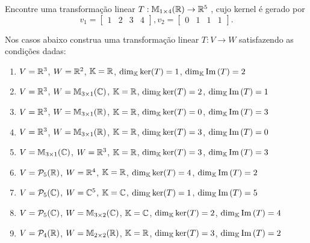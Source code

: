 \documentclass[12pt]{exam}
\begin{document}
\begin{exercicio}
  Encontre uma transforma\c{c}\~ao linear $T : \mathbb{M}_{1 \times 4}(\mathbb{R}) \to \mathbb{R}^5$ , cujo kernel \'e gerado por
  \[
      v_1 = \begin{bmatrix}
                1 & 2 & 3 & 4
            \end{bmatrix},
      v_2 = \begin{bmatrix}
                0 & 1 & 1 & 1
            \end{bmatrix}.
  \]
\end{exercicio}

\begin{exercicio}
  Nos casos abaixo construa uma transforma\c{c}\~ao linear $T : V \to W$ satisfazendo as condi\c{c}\~oes dadas:
  \begin{enumerate}[label={\alph*})]
    \item $V = \mathbb{R}^3$, $W = \mathbb{R}^2$, $\mathbb{K} = \mathbb{R}$, $\dim_{\mathbb{K}} \ker(T) = 1$, $\dim_{\mathbb{K}} {\rm Im\,}(T) = 2$

    \item $V = \mathbb{R}^3$, $W = \mathbb{M}_{3\times 1}(\mathbb{C})$, $\mathbb{K} = \mathbb{R}$, $\dim_{\mathbb{K}} \ker(T) = 2$, $\dim_{\mathbb{K}} {\rm Im\,}(T) = 1$

    \item $V = \mathbb{R}^3$, $W = \mathbb{M}_{3\times 1}(\mathbb{R})$, $\mathbb{K} = \mathbb{R}$, $\dim_{\mathbb{K}} \ker(T) = 0$, $\dim_{\mathbb{K}} {\rm Im\,}(T) = 3$

    \item $V = \mathbb{R}^3$, $W = \mathbb{M}_{3\times 1}(\mathbb{R})$, $\mathbb{K} = \mathbb{R}$, $\dim_{\mathbb{K}} \ker(T) = 3$, $\dim_{\mathbb{K}} {\rm Im\,}(T) = 0$

    \item $V = \mathbb{M}_{3\times 1}(\mathbb{C})$, $W = \mathbb{R}^3$, $\mathbb{K} = \mathbb{R}$, $\dim_{\mathbb{K}} \ker(T) = 3$, $\dim_{\mathbb{K}} {\rm Im\,}(T) = 3$

    \item $V = \mathcal{P}_5(\mathbb{R})$, $W = \mathbb{R}^4$, $\mathbb{K} = \mathbb{R}$, $\dim_{\mathbb{K}} \ker(T) = 4$, $\dim_{\mathbb{K}} {\rm Im\,}(T) = 2$

    \item $V = \mathcal{P}_5(\mathbb{C})$, $W = \mathbb{C}^5$, $\mathbb{K} = \mathbb{C}$, $\dim_{\mathbb{K}} \ker(T) = 1$, $\dim_{\mathbb{K}} {\rm Im\,}(T) = 5$

    \item $V = \mathcal{P}_5(\mathbb{C})$, $W = \mathbb{M}_{3\times 2}(\mathbb{C})$, $\mathbb{K} = \mathbb{C}$, $\dim_{\mathbb{K}} \ker(T) = 2$, $\dim_{\mathbb{K}} {\rm Im\,}(T) = 4$

    \item $V = \mathcal{P}_4(\mathbb{R})$, $W = \mathbb{M}_{2\times 2}(\mathbb{R})$, $\mathbb{K} = \mathbb{R}$, $\dim_{\mathbb{K}} \ker(T) = 3$, $\dim_{\mathbb{K}} {\rm Im\,}(T) = 2$
  \end{enumerate}
\end{exercicio}
\end{document}
